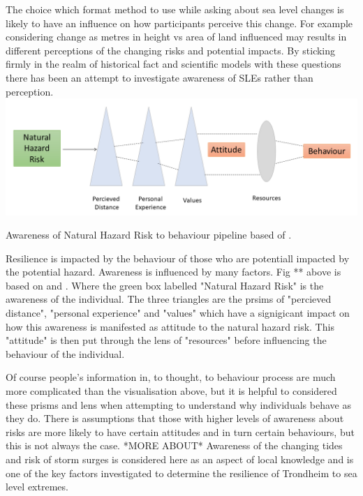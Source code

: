 \documentclass{article}
\begin{document}
The choice which format method to use while asking about sea level changes is likely to have an influence on how participants perceive this change. For example considering change as metres in height vs area of land influenced may results in different perceptions of the changing risks and potential impacts.  By sticking firmly in the realm of historical fact and scientific models with these questions there has been an attempt to investigate awareness of SLEs rather than perception. 
\includegraphics[width=1\textwidth]{fig_theory/awareness lujala and whitmarsh.png}

\begin{frame}{Awareness of Natural Hazard Risk to behaviour pipeline based of \cite{lujala_climate_2015}\cite{whitmarsh_are_2008}.}
\end{frame}

Resilience is impacted by the behaviour of those who are potentiall impacted by the potential hazard. Awareness is influenced by many factors. Fig ** above is based on \cite{whitmarsh_are_2008} and \cite{lujala_climate_2015} . Where the green box labelled "Natural Hazard Risk" is the awareness of the individual. The three triangles are the prsims of "percieved distance", "personal experience" and "values" which have a signigicant impact on how this awareness is manifested as attitude to the natural hazard risk. This "attitude" is then put through the lens of "resources" before influencing the behaviour of the individual. 

Of course people's information in, to thought, to behaviour process are much more complicated than the visualisation above, but it is helpful to considered these prisms and lens when attempting to understand why individuals behave as they do. There is assumptions that those with higher levels of awareness about risks are more likely to have certain attitudes and in turn certain behaviours, but this is not always the case. 
*MORE ABOUT*\cite{lujala_climate_2015}  Awareness of the changing tides and risk of storm surges is considered here as an aspect of local knowledge and is one of the key factors investigated to determine the resilience of Trondheim to sea level extremes. 
\end{document}
